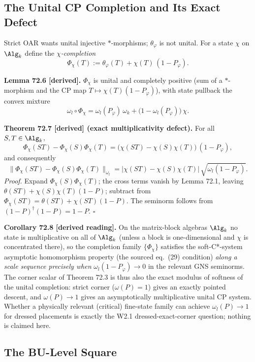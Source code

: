 \subsection{The Unital CP Completion and Its Exact Defect}

Strict OAR wants unital injective \(*\)-morphisms; \(\theta_\varphi\) is
not unital.  For a state \(\chi\) on \(\Alg_k\) define the
\emph{\(\chi\)-completion}
\[
  \Phi_\chi(T):=\theta_\varphi(T)+\chi(T)\,(1-P_\varphi).
\]

\textbf{Lemma 72.6 [derived].}  \(\Phi_\chi\) is unital and completely
positive (sum of a \(*\)-morphism and the CP map
\(T\mapsto\chi(T)(1-P_\varphi)\)), with state pullback the convex mixture
\[
  \omega_l\circ\Phi_\chi
  =\omega_l(P_\varphi)\,\omega_k+\bigl(1-\omega_l(P_\varphi)\bigr)\,\chi .
\]

\textbf{Theorem 72.7 [derived] (exact multiplicativity defect).}  For all
\(S,T\in\Alg_k\),
\[
  \Phi_\chi(ST)-\Phi_\chi(S)\Phi_\chi(T)
  =\bigl(\chi(ST)-\chi(S)\chi(T)\bigr)\,(1-P_\varphi),
\]
and consequently
\[
  \bigl\|\Phi_\chi(ST)-\Phi_\chi(S)\Phi_\chi(T)\bigr\|_{\omega_l}
  =\bigl|\chi(ST)-\chi(S)\chi(T)\bigr|\,
   \sqrt{\omega_l(1-P_\varphi)} .
\]
\emph{Proof.}  Expand \(\Phi_\chi(S)\Phi_\chi(T)\); the cross terms vanish
by Lemma 72.1, leaving
\(\theta(ST)+\chi(S)\chi(T)(1-P)\); subtract from
\(\Phi_\chi(ST)=\theta(ST)+\chi(ST)(1-P)\).  The seminorm follows from
\((1-P)^\dagger(1-P)=1-P\). \(\square\)

\textbf{Corollary 72.8 [derived reading].}  On the matrix-block algebras
\(\Alg_k\) no state is multiplicative on all of \(\Alg_k\) (unless a block
is one-dimensional and \(\chi\) is concentrated there), so the completion
family \(\{\Phi_\chi\}\) satisfies the soft-C*-system asymptotic
homomorphism property (the sourced eq.~(29) condition) \emph{along a scale
sequence precisely when} \(\omega_l(1-P_{\varphi})\to0\) in the relevant
GNS seminorms.  The corner scalar of Theorem 72.3 is thus also the exact
modulus of softness of the unital completion: strict corner
(\(\omega(P)=1\)) gives an exactly pointed descent, and
\(\omega(P)\to1\) gives an asymptotically multiplicative unital CP system.
Whether a physically relevant (critical) fine-state family can achieve
\(\omega_l(P)\to1\) for dressed placements is exactly the W2.1
dressed-exact-corner question; nothing is claimed here.

\subsection{The BU-Level Square}

